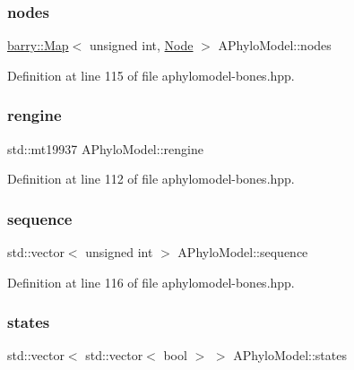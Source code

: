 \subsubsection{\texorpdfstring{nodes}{nodes}}
{\footnotesize\ttfamily \hyperlink{namespacebarry_a979a04835a9855ff2054c383c569c89e}{barry\+::\+Map}$<$ unsigned int, \hyperlink{class_node}{Node} $>$ A\+Phylo\+Model\+::nodes}



Definition at line 115 of file aphylomodel-\/bones.\+hpp.

\mbox{\label{class_a_phylo_model_a3f7a406330ca376840dcea3324e69448}} 
\subsubsection{\texorpdfstring{rengine}{rengine}}
{\footnotesize\ttfamily std\+::mt19937 A\+Phylo\+Model\+::rengine}



Definition at line 112 of file aphylomodel-\/bones.\+hpp.

\mbox{\label{class_a_phylo_model_a5f15ec301385244387c9be5290f5ee28}} 
\subsubsection{\texorpdfstring{sequence}{sequence}}
{\footnotesize\ttfamily std\+::vector$<$ unsigned int $>$ A\+Phylo\+Model\+::sequence}



Definition at line 116 of file aphylomodel-\/bones.\+hpp.

\mbox{\label{class_a_phylo_model_aa6a0a51491c065588bb3504d9b84540c}} 
\subsubsection{\texorpdfstring{states}{states}}
{\footnotesize\ttfamily std\+::vector$<$ std\+::vector$<$ bool $>$ $>$ A\+Phylo\+Model\+::states}




